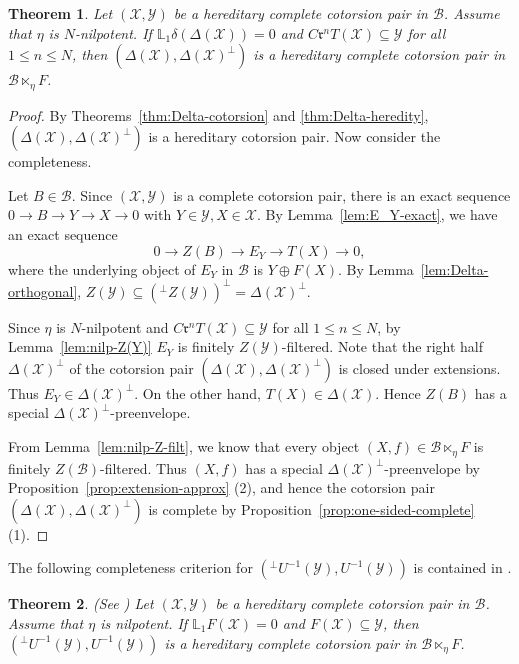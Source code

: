 \documentclass[11pt,reqno]{amsart}
\numberwithin{equation}{section}
\newtheorem{theorem}{Theorem}[section]
\newcommand{\cB}{\mathcal B}
\newcommand{\cX}{\mathcal X}
\newcommand{\cY}{\mathcal Y}
\newcommand{\radf}{\mathfrak r}
\begin{document}
\begin{theorem}\label{thm:completeness}
Let $(\cX,\cY)$ be a hereditary complete cotorsion pair in $\cB$. Assume that $\eta$ is $N$-nilpotent. If $\mathbb{L}_1\delta(\Delta(\cX))=0$ and $C\radf^nT(\cX)\subseteq \cY$ for all $1\leq n\leq N$, then $(\Delta(\cX),\Delta(\cX)^\perp)$ is
a hereditary complete cotorsion pair in $\cB\ltimes_\eta F$.
\end{theorem}
\begin{proof}
By Theorems~\ref{thm:Delta-cotorsion} and \ref{thm:Delta-heredity}, $(\Delta(\cX),\Delta(\cX)^\perp)$ is a hereditary cotorsion pair.
Now consider the completeness.

Let $B\in \cB$. Since $(\cX, \cY)$ is a complete cotorsion pair, there is an exact sequence $0\to B\to Y\to X\to 0$ with $Y\in \cY, X\in \cX$. By Lemma~\ref{lem:E_Y-exact}, we
have an exact sequence
\[
0\to Z(B)\to E_Y \to T(X)\to 0,
\]
where the underlying object of $E_Y$ in $\cB$ is $Y\oplus F(X)$.
By Lemma~\ref{lem:Delta-orthogonal}, $Z(\cY)\subseteq ({}^\perp Z(\cY))^\perp = \Delta(\cX)^\perp$.

Since $\eta$ is $N$-nilpotent and $C\radf^nT(\cX)\subseteq \cY$ for all $1\leq n\leq N$,
by Lemma~\ref{lem:nilp-Z(Y)} $E_Y$ is finitely $Z(\cY)$-filtered. Note that the right half $\Delta(\cX)^\perp$ of the cotorsion
pair $(\Delta(\cX),\Delta(\cX)^\perp)$ is closed under extensions. Thus $E_Y\in \Delta(\cX)^\perp$. On the other hand, $T(X)\in \Delta(\cX)$. Hence
$Z(B)$  has a special $\Delta(\cX)^{\perp}$-preenvelope.

From Lemma~\ref{lem:nilp-Z-filt}, we know that every object $(X,f)\in \cB\ltimes_\eta F$ is
finitely $Z(\cB)$-filtered. Thus $(X,f)$ has a special $\Delta(\cX)^\perp$-preenvelope by Proposition~\ref{prop:extension-approx} (2), and hence
the cotorsion pair $(\Delta(\cX),\Delta(\cX)^\perp)$ is complete by Proposition~\ref{prop:one-sided-complete} (1).
\end{proof}


The following completeness criterion for $({}^\perp U^{-1}(\cY), U^{-1}(\cY))$ is contained in \cite{LG}.

\begin{theorem}\label{thm:pre-U-completeness}
{\rm (See \cite[Theorem~4.13]{LG})}
Let $(\cX,\cY)$ be a hereditary complete cotorsion pair in $\cB$. Assume that $\eta$ is nilpotent. If $\mathbb{L}_1F(\cX)=0$ and $F(\cX)\subseteq \cY$, then $({}^\perp U^{-1}(\cY), U^{-1}(\cY))$ is
a hereditary complete cotorsion pair in $\cB\ltimes_\eta F$.
\end{theorem}
\end{document}
